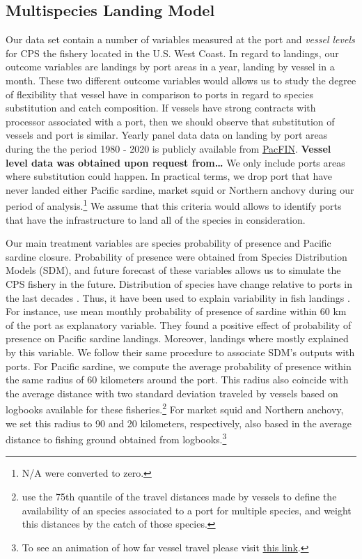 \documentclass[
]{article}
\begin{document}
\hypertarget{multispecies-landing-model}{%
\subsection{Multispecies Landing
Model}\label{multispecies-landing-model}}

Our data set contain a number of variables measured at the port and
\emph{vessel levels} for CPS the fishery located in the U.S. West Coast.
In regard to landings, our outcome variables are landings by port areas
in a year, landing by vessel in a month. These two different outcome
variables would allows us to study the degree of flexibility that vessel
have in comparison to ports in regard to species substitution and catch
composition. If vessels have strong contracts with processor associated
with a port, then we should observe that substitution of vessels and
port is similar. Yearly panel data data on landing by port areas during
the the period 1980 - 2020 is publicly available from
\href{http://pacfin.psmfc.org/}{PacFIN}. \textbf{Vessel level data was
obtained upon request from\ldots{}} We only include ports areas where
substitution could happen. In practical terms, we drop port that have
never landed either Pacific sardine, market squid or Northern anchovy
during our period of analysis.\footnote{N/A were converted to zero.} We
assume that this criteria would allows to identify ports that have the
infrastructure to land all of the species in consideration.

Our main treatment variables are species probability of presence and
Pacific sardine closure. Probability of presence were obtained from
Species Distribution Models (SDM), and future forecast of these
variables allows us to simulate the CPS fishery in the future.
Distribution of species have change relative to ports in the last
decades \citep{selden2020}. Thus, it have been used to explain
variability in fish landings
\citep[\citet{smith2021potential}]{selden2020}. For instance,
\citet{smith2021potential} use mean monthly probability of presence of
sardine within 60 km of the port as explanatory variable. They found a
positive effect of probability of presence on Pacific sardine landings.
Moreover, landings where mostly explained by this variable. We follow
their same procedure to associate SDM's outputs with ports. For Pacific
sardine, we compute the average probability of presence within the same
radius of 60 kilometers around the port. This radius also coincide with
the average distance with two standard deviation traveled by vessels
based on logbooks available for these fisheries.\footnote{\citet{selden2020}
  use the 75th quantile of the travel distances made by vessels to
  define the availability of an species associated to a port for
  multiple species, and weight this distances by the catch of those
  species.} For market squid and Northern anchovy, we set this radius to
90 and 20 kilometers, respectively, also based in the average distance
to fishing ground obtained from logbooks.\footnote{To see an animation
  of how far vessel travel please visit
  \href{https://drive.google.com/file/d/1-PE_lcZNcXNcyILA_6xhkHyEhV3mV2TA/view?usp=sharing}{this
  link}.}
\end{document}
